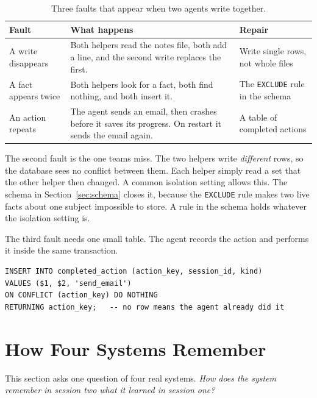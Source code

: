 \documentclass[11pt,a4paper]{article}
\newcommand{\code}[1]{\texttt{\small #1}}
\begin{document}
\begin{table}[H]
\centering
\caption[Faults with two writers]{Three faults that appear when two agents write together.}
\label{tab:conc}
{\small
\begin{tabularx}{\textwidth}{L{3.2cm} X L{3.0cm}}
\toprule
\sffamily\bfseries Fault & \sffamily\bfseries What happens &
\sffamily\bfseries Repair \\
\midrule
A write disappears & Both helpers read the notes file, both add a line,
and the second write replaces the first. & Write single rows, not whole
files \\
A fact appears twice & Both helpers look for a fact, both find nothing,
and both insert it. & The \code{EXCLUDE} rule in the schema \\
An action repeats & The agent sends an email, then crashes before it
saves its progress. On restart it sends the email again. & A table of
completed actions \\
\bottomrule
\end{tabularx}}
\end{table}

The second fault is the one teams miss. The two helpers write
\emph{different} rows, so the database sees no conflict between them.
Each helper simply read a set that the other helper then changed. A
common isolation setting allows this. The schema in
Section~\ref{sec:schema} closes it, because the \code{EXCLUDE} rule makes
two live facts about one subject impossible to store. A rule in the
schema holds whatever the isolation setting is.

The third fault needs one small table. The agent records the action and
performs it inside the same transaction.

\begin{lstlisting}[style=sql,caption={A table of completed actions stops a repeat after a crash.}]
INSERT INTO completed_action (action_key, session_id, kind)
VALUES ($1, $2, 'send_email')
ON CONFLICT (action_key) DO NOTHING
RETURNING action_key;   -- no row means the agent already did it
\end{lstlisting}

\section{How Four Systems Remember}

This section asks one question of four real systems. \emph{How does the
system remember in session two what it learned in session one?}
\end{document}
